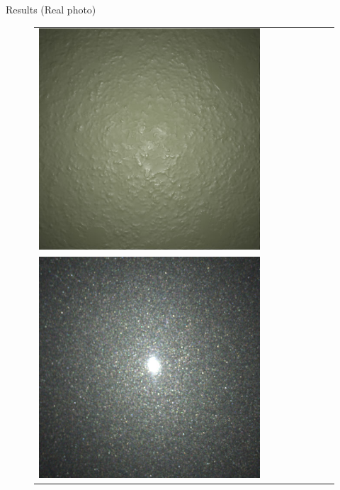 \documentclass[final]{beamer}
\newlength{\twocolwid}
\newlength{\resultwidth}
\begin{document}
\begin{frame}[t]
\begin{columns}[t]
\begin{column}{\twocolwid}
\begin{block}{Results (Real photo)}
\begin{figure}[t]
\begin{tabular}{ccrclccc}
            		\includegraphics[width=\resultwidth]{real/plaster/bad1.jpg}
            		\\
            		\includegraphics[width=\resultwidth]{real/flake/target.jpg} &

\end{tabular}
\end{figure}
\end{block}
\end{column}
\end{columns}
\end{frame}
\end{document}

